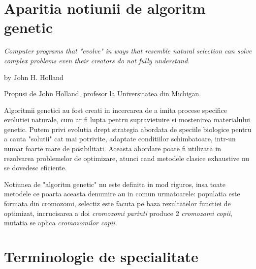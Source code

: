 \section{ Aparitia notiunii de algoritm genetic }

\begin{center}
	\textit{Computer programs that "evolve" in ways that resemble natural selection can solve complex problems even their creators do not fully understand. }
\end{center}
by John H. Holland 

Propusi de John Holland, profesor la Universitatea din Michigan.

Algoritmii genetici au fost creati in incercarea de a imita procese specifice evolutiei naturale, cum ar fi lupta pentru supravietuire si mostenirea materialului genetic. Putem privi evolutia drept strategia abordata de speciile biologice pentru a cauta "solutii" cat mai potrivite, adaptate conditiilor schimbatoare, intr-un numar foarte mare de posibilitati. Aceasta abordare poate fi utilizata in rezolvarea problemelor de optimizare, atunci cand metodele clasice exhaustive nu se dovedesc eficiente.

\cite{introduction_by_melanie_mitchell}
Notiunea de "algoritm genetic" nu este definita in mod riguros, insa toate metodele ce poarta aceasta denumire au in comun urmatoarele: populatia este formata din cromozomi, selectiz este facuta pe baza rezultatelor functiei de optimizat, incrucisarea a doi \textit{cromozomi parinti} produce 2 \textit{cromozomi copii}, mutatia se aplica \textit{cromozomilor copii}\cite{introduction_by_melanie_mitchell}.

\section{Terminologie de specialitate}

